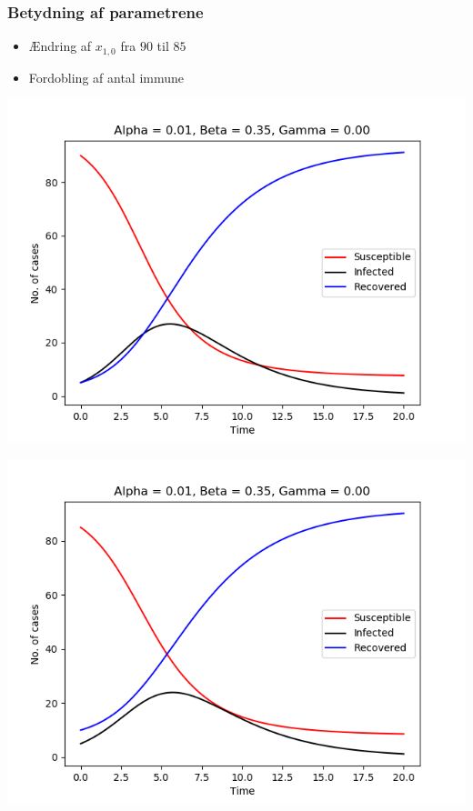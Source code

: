 \begin{frame}
\frametitle{Betydning af parametrene}
\begin{itemize}
\item Ændring af $x_{1,0}$ fra $90$ til $85$
\item Fordobling af antal immune
\end{itemize}

\begin{minipage}{0.49\textwidth}
\includegraphics[scale=0.3]{fig/img/t_a1_b35_g0.png}
\end{minipage}
%
\begin{minipage}{0.49\textwidth}
\includegraphics[scale=0.3]{fig/img/t_x1_5_x2_85.png}
\end{minipage}
\end{frame}

